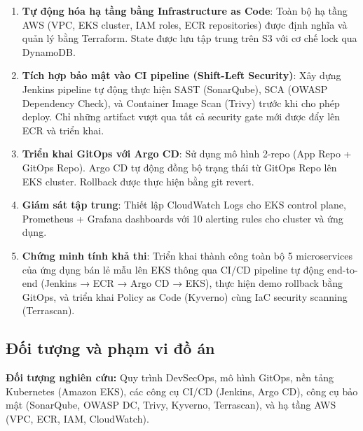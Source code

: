 \documentclass[13pt,a4paper,twoside]{extarticle}
\begin{document}
\begin{enumerate}[leftmargin=*,nosep]
  \item \textbf{Tự động hóa hạ tầng bằng Infrastructure as Code}: Toàn bộ hạ tầng AWS (VPC, EKS cluster, IAM roles, ECR repositories) được định nghĩa và quản lý bằng Terraform. State được lưu tập trung trên S3 với cơ chế lock qua DynamoDB.

  \item \textbf{Tích hợp bảo mật vào CI pipeline (Shift-Left Security)}: Xây dựng Jenkins pipeline tự động thực hiện SAST (SonarQube), SCA (OWASP Dependency Check), và Container Image Scan (Trivy) trước khi cho phép deploy. Chỉ những artifact vượt qua tất cả security gate mới được đẩy lên ECR và triển khai.

  \item \textbf{Triển khai GitOps với Argo CD}: Sử dụng mô hình 2-repo (App Repo + GitOps Repo). Argo CD tự động đồng bộ trạng thái từ GitOps Repo lên EKS cluster. Rollback được thực hiện bằng git revert.

  \item \textbf{Giám sát tập trung}: Thiết lập CloudWatch Logs cho EKS control plane, Prometheus + Grafana dashboards với 10 alerting rules cho cluster và ứng dụng.

  \item \textbf{Chứng minh tính khả thi}: Triển khai thành công toàn bộ 5 microservices của ứng dụng bán lẻ mẫu lên EKS thông qua CI/CD pipeline tự động end-to-end (Jenkins → ECR → Argo CD → EKS), thực hiện demo rollback bằng GitOps, và triển khai Policy as Code (Kyverno) cùng IaC security scanning (Terrascan).
\end{enumerate}

\subsection{Đối tượng và phạm vi đồ án}

\textbf{Đối tượng nghiên cứu:} Quy trình DevSecOps, mô hình GitOps, nền tảng Kubernetes (Amazon EKS), các công cụ CI/CD (Jenkins, Argo CD), công cụ bảo mật (SonarQube, OWASP DC, Trivy, Kyverno, Terrascan), và hạ tầng AWS (VPC, ECR, IAM, CloudWatch).
\end{document}
